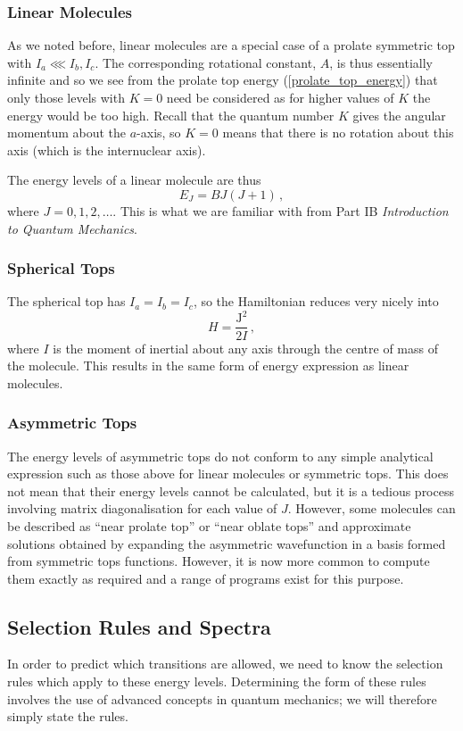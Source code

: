 \documentclass{article}
\theoremstyle{plain}\theoremheaderfont{\normalfont\itshape}\theorembodyfont{\rmfamily}\theoremseparator{.}\newtheorem*{rem}{Remark}\newtheorem*{ex}{Example}\newtheorem*{proof}{Proof}\newtheorem*{altp}{Alternative proof}
\theoremstyle{plain}\theoremheaderfont{\normalfont\bfseries}\theorembodyfont{\rmfamily}\theoremseparator{.}\newtheorem{thm}{Theorem}[section]\newtheorem{lem}[thm]{Lemma}\newtheorem{prop}[thm]{Proposition}\newtheorem*{cor}{Corollary}\newtheorem{defn}[thm]{Definition}\newtheorem{clm}[thm]{Claim}\newtheorem{clminproof}{Claim}\newtheorem{pos}{Postulate}[section]
\theoremstyle{break}\theoremheaderfont{\normalfont\itshape}\theorembodyfont{\rmfamily}\theoremseparator{.\medskip}\newtheorem*{proofskip}{Proof}\newtheorem*{exs}{Examples}\newtheorem*{rems}{Remarks}
\theoremstyle{break}\theoremheaderfont{\normalfont\bfseries}\theorembodyfont{\rmfamily}\theoremseparator{.\medskip}\newtheorem{lemskip}[thm]{Lemma}\newtheorem{defnskip}[thm]{Definition}\newtheorem{propskip}[thm]{Proposition}\newtheorem{thmskip}[thm]{Theorem}
\numberwithin{equation}{section}
\newcommand{\vb}[1]{\bm{\mathrm{#1}}}
\begin{document}
    \subsubsection{Linear Molecules}
    As we noted before, linear molecules are a special case of a prolate symmetric top with \(I_a\lll I_b,I_c\). The corresponding rotational constant, \(A\), is thus essentially infinite and so we see from the prolate top energy (\ref{prolate_top_energy}) that only those levels with \(K=0\) need be considered as for higher values of \(K\) the energy would be too high. Recall that the quantum
    number \(K\) gives the angular momentum about the \(a\)-axis, so \(K=0\) means that there is no rotation about this axis (which is the internuclear axis).

    The energy levels of a linear molecule are thus
    \begin{equation}
        E_J=BJ(J+1)\,,
    \end{equation}
    where \(J=0,1,2,\dots\). This is what we are familiar with from Part IB \textit{Introduction to Quantum Mechanics}.
    \subsubsection{Spherical Tops}
    The spherical top has \(I_a=I_b=I_c\), so the Hamiltonian reduces very nicely into
    \begin{equation}
        H=\frac{\vb{J}^2}{2I}\,,
    \end{equation}
    where \(I\) is the moment of inertial about any axis through the centre of mass of the molecule. This results in the same form of energy expression as linear molecules.
    \subsubsection{Asymmetric Tops}
    The energy levels of asymmetric tops do not conform to any simple analytical expression such as those above for linear molecules or symmetric tops. This does not mean that their energy levels cannot be calculated, but it is a tedious process involving matrix diagonalisation for each value of \(J\). However, some molecules can be described as ``near prolate top'' or ``near oblate tops'' and approximate solutions obtained by expanding the asymmetric wavefunction in a basis formed from symmetric tops functions. However, it is now more common to compute them exactly as required and a range of programs exist for this purpose.

    \subsection{Selection Rules and Spectra}
    In order to predict which transitions are allowed, we need to know the selection rules which apply to these energy levels. Determining the form of these rules involves the use of advanced concepts in quantum mechanics; we will therefore simply state the rules.
\end{document}
